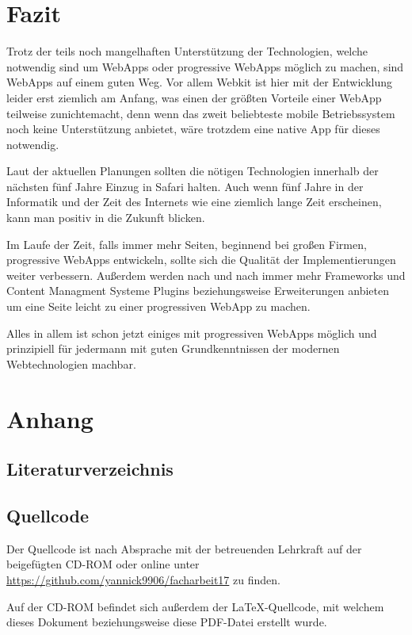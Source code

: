 \documentclass[a4paper,12pt,ngerman,listof=numbered]{scrartcl}      %
\begin{document}
	\section{Fazit}
	Trotz der teils noch mangelhaften Unterstützung der Technologien, welche notwendig sind um WebApps oder progressive WebApps möglich zu machen, sind WebApps auf einem guten Weg. Vor allem Webkit ist hier mit der Entwicklung leider erst ziemlich am Anfang, was einen der größten Vorteile einer WebApp teilweise zunichtemacht, denn wenn das zweit beliebteste mobile Betriebssystem noch keine Unterstützung anbietet, wäre trotzdem eine native App für dieses notwendig.\par
	Laut der aktuellen Planungen sollten die nötigen Technologien innerhalb der nächsten fünf Jahre Einzug in Safari halten. Auch wenn fünf Jahre in der Informatik und der Zeit des Internets wie eine ziemlich lange Zeit erscheinen, kann man positiv in die Zukunft blicken.\par
	Im Laufe der Zeit, falls immer mehr Seiten, beginnend bei großen Firmen, progressive WebApps entwickeln, sollte sich die Qualität der Implementierungen weiter verbessern. Außerdem werden nach und nach immer mehr Frameworks und Content Managment Systeme Plugins beziehungsweise Erweiterungen anbieten um eine Seite leicht zu einer progressiven WebApp zu machen.\par
	Alles in allem ist schon jetzt einiges mit progressiven WebApps möglich und prinzipiell für jedermann mit guten Grundkenntnissen der modernen Webtechnologien machbar.\par
	
	
	\newpage
	\section{Anhang}
	\subsection{Literaturverzeichnis}
	\printbibliography[heading=none]
	
	\subsection{Quellcode}
	Der Quellcode ist nach Absprache mit der betreuenden Lehrkraft auf der beigefügten CD-ROM oder online unter \url{https://github.com/yannick9906/facharbeit17} zu finden.\par
	Auf der CD-ROM befindet sich außerdem der \LaTeX-Quellcode, mit welchem dieses Dokument beziehungsweise diese PDF-Datei erstellt wurde.
	
\end{document}

